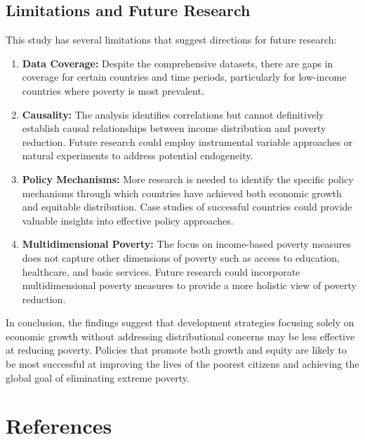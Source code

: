 \documentclass[12pt,a4paper]{article}
\begin{document}
\subsection{Limitations and Future Research}
This study has several limitations that suggest directions for future research:
\begin{enumerate}
    \item \textbf{Data Coverage:} Despite the comprehensive datasets, there are gaps in coverage for certain countries and time periods, particularly for low-income countries where poverty is most prevalent.
    \item \textbf{Causality:} The analysis identifies correlations but cannot definitively establish causal relationships between income distribution and poverty reduction. Future research could employ instrumental variable approaches or natural experiments to address potential endogeneity.
    \item \textbf{Policy Mechanisms:} More research is needed to identify the specific policy mechanisms through which countries have achieved both economic growth and equitable distribution. Case studies of successful countries could provide valuable insights into effective policy approaches.
    \item \textbf{Multidimensional Poverty:} The focus on income-based poverty measures does not capture other dimensions of poverty such as access to education, healthcare, and basic services. Future research could incorporate multidimensional poverty measures to provide a more holistic view of poverty reduction.
\end{enumerate}

In conclusion, the findings suggest that development strategies focusing solely on economic growth without addressing distributional concerns may be less effective at reducing poverty. Policies that promote both growth and equity are likely to be most successful at improving the lives of the poorest citizens and achieving the global goal of eliminating extreme poverty.

\clearpage
\section{References}


\end{document}
